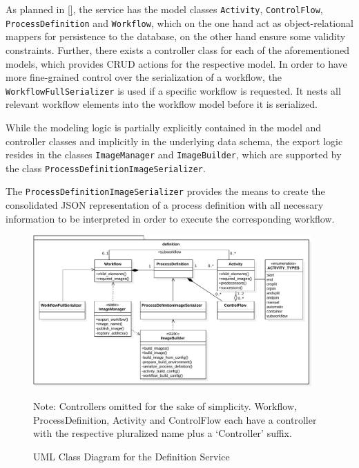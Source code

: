     As planned in \ref{}, the service has the model classes \texttt{Activity}, \texttt{ControlFlow}, \texttt{ProcessDefinition} and \texttt{Workflow}, which on the one hand act as object-relational mappers for persistence to the database, on the other hand ensure some validity constraints. Further, there exists a controller class for each of the aforementioned models, which provides \ac{CRUD} actions for the respective model. In order to have more fine-grained control over the serialization of a workflow, the \texttt{WorkflowFullSerializer} is used if a specific workflow is requested. It nests all relevant workflow elements into the workflow model before it is serialized.

    While the modeling logic is partially explicitly contained in the model and controller classes and implicitly in the underlying data schema, the export logic resides in the classes \texttt{ImageManager} and \texttt{ImageBuilder}, which are supported by the class \texttt{ProcessDefinitionImageSerializer}.

    The \texttt{ProcessDefinitionImageSerializer} provides the means to create the consolidated JSON representation of a process definition with all necessary information to be interpreted in order to execute the corresponding workflow.


    \begin{figure}[htbp]
      \centering
      \includegraphics[width=0.95\textwidth]{content/images/class_diagram_definition-crop.pdf}
      \caption*{\scriptsize Note: Controllers omitted for the sake of simplicity. Workflow, ProcessDefinition, Activity and ControlFlow each have a controller with the respective pluralized name plus a `Controller' suffix.}
      \caption{UML Class Diagram for the Definition Service}
      \label{fig:label}
    \end{figure}


